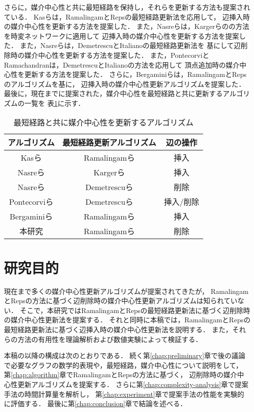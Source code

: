 さらに，媒介中心性と共に最短経路を保持し，それらを更新する方法も提案されている．
Kasらは，RamalingamとRepsの最短経路更新法\cite{Ramalingam1996}を応用して，
辺挿入時の媒介中心性を更新する方法を提案した\cite{Kas2013}．
また，Nasreらは，Kargerらの\cite{Karger1993}の方法を時変ネットワークに適用して
辺挿入時の媒介中心性を更新する方法を提案し\cite{Nasre2014a}た．
また，Nasreらは，DemetrescuとItalianoの最短経路更新法\cite{Demetrescu2003}を
基にして辺削除時の媒介中心性を更新する方法を提案した\cite{Nasre2014b}．
また，PontecorviとRamachandranは，DemetrescuとItalianoの方法を応用して
頂点追加時の媒介中心性を更新する方法を提案した\cite{Pontecorvi2015}．
さらに，Bergaminiらは，RamalingamとRepsのアルゴリズムを基に，
辺挿入時の媒介中心性更新アルゴリズムを提案した\cite{Bergamini2017}．
最後に，現在までに提案された，媒介中心性を最短経路と共に更新するアルゴリズムの一覧を
表\ref{tab:comparison-of-algorithms}に示す．

\begin{table}[tb]
  \centering
  \caption{最短経路と共に媒介中心性を更新するアルゴリズム}
  \label{tab:comparison-of-algorithms}
  \begin{tabular}{ccc}
    \hline
    アルゴリズム & 最短経路更新アルゴリズム & 辺の操作 \\ \hline
    Kasら\cite{Kas2013} & Ramalingamら\cite{Ramalingam1996} & 挿入 \\ \hline
    Nasreら\cite{Nasre2014a} & Kargerら\cite{Karger1993} & 挿入 \\ \hline
    Nasreら\cite{Nasre2014b} & Demetrescuら\cite{Demetrescu2003} & 削除 \\ \hline
    Pontecorviら\cite{Pontecorvi2015} & Demetrescuら\cite{Demetrescu2003} & 挿入/削除 \\ \hline
    Bergaminiら\cite{Bergamini2017} & Ramalingamら\cite{Ramalingam1996} & 挿入 \\ \hline
    本研究 & Ramalingamら\cite{Ramalingam1996} & 削除 \\ \hline
  \end{tabular}
\end{table}

\section{研究目的}

現在まで多くの媒介中心性更新アルゴリズムが提案されてきたが，
RamalingamとRepsの方法に基づく辺削除時の媒介中心性更新アルゴリズムは知られていない．
そこで，本研究ではRamalingamとRepsの最短経路更新法に基づく辺削除時の媒介中心性更新法を提案する．
それと同時に本稿では，RamalingamとRepsの最短経路更新法に基づく辺挿入時の媒介中心性更新法を説明する．
また，それらの方法の有用性を理論解析および数値実験によって検証する．

本稿の以降の構成は次のとおりである．
続く第\ref{chap:preliminary}章で後の議論で必要なグラフの数学的表現や，最短経路，媒介中心性について説明をして，
第\ref{chap:algorithm}章でRamalingamとRepsの方法に基づく，
辺削除時の媒介中心性更新アルゴリズムを提案する．
さらに第\ref{chap:complexity-analysis}章で提案手法の時間計算量を解析し，
第\ref{chap:experiment}章で提案手法の性能を実験的に評価する．
最後に第\ref{chap:conclusion}章で結論を述べる．
